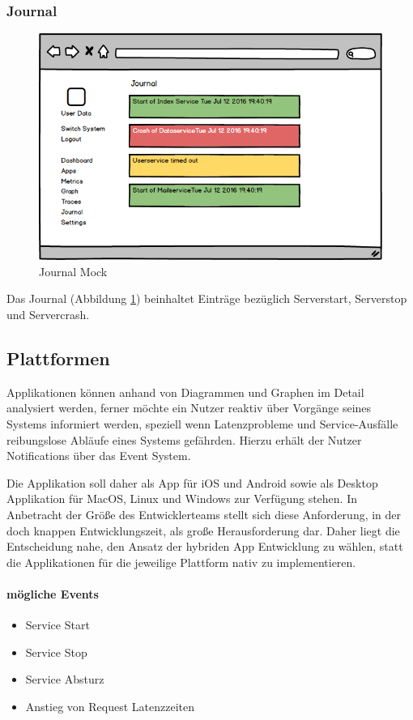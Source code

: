 \subsubsection{Journal}

\begin{figure}[h]
 \centering
 \includegraphics[width=0.7\linewidth]{kapitel1/mocks/journal.png}
 \caption{Journal Mock}
 \label{fig:journalmock}
\end{figure}

Das Journal (Abbildung \ref{fig:journalmock}) beinhaltet Einträge bezüglich Serverstart, Serverstop und Servercrash.


\newpage

\subsection{Plattformen}

Applikationen können anhand von Diagrammen und Graphen im Detail analysiert werden,
ferner möchte ein Nutzer reaktiv über Vorgänge seines Systems informiert werden, speziell wenn Latenzprobleme und Service-Ausfälle reibungslose Abläufe eines Systems gefährden.
Hierzu erhält der Nutzer Notifications über das Event System.

Die Applikation soll daher als App für iOS und Android sowie als Desktop Applikation für MacOS, Linux und Windows zur Verfügung stehen.
In Anbetracht der Größe des Entwicklerteams stellt sich diese Anforderung, in der doch knappen Entwicklungszeit, als große Herausforderung dar.
Daher liegt die Entscheidung nahe, den Ansatz der hybriden App Entwicklung zu wählen, statt die Applikationen für die jeweilige Plattform nativ zu implementieren.

\paragraph{mögliche Events}
\begin{itemize}
\item Service Start
\item Service Stop
\item Service Absturz
\item Anstieg von Request Latenzzeiten
\end{itemize}
